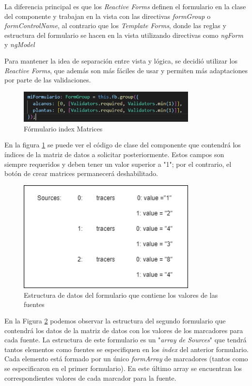 La diferencia principal es que los \emph{Reactive Forms} definen el formulario en la clase del componente y trabajan  en la vista con las directivas \emph{formGroup} o \emph{formControlName},  al contrario que los \emph{Template Forms}, donde las reglas y estructura del  formulario se hacen en la vista utilizando directivas como \emph{ngForm} y \emph{ngModel}

Para mantener la idea de separación entre vista y lógica, se decidió utilizar los \emph{Reactive Forms}, que además son más fáciles de usar y permiten más adaptaciones por parte de las validaciones.

\begin{figure}[h!] 
\centering
    \includegraphics[width=0.8\textwidth]{img/formIndexMatrix.PNG}
\caption{Fórmulario index Matrices}
\label{fig:formIndexMatrix}
\end{figure}

En la figura \ref{fig:formIndexMatrix} se puede ver el código de clase del componente que contendrá los índices de la matriz de datos a solicitar posteriormente. Estos campos son siempre requeridos y deben tener un valor superior a "1"; por el contrario, el botón de crear matrices permanecerá deshabilitado.

\begin{figure}[h!] 
\centering
    \includegraphics[width=0.8\textwidth]{img/formSources.png}
\caption{Estructura de datos del formulario que contiene los valores de las fuentes}
\label{fig:formSources}
\end{figure}

En la Figura \ref{fig:formSources} podemos observar la estructura del segundo formulario que contendrá los datos de la matriz de datos con los valores de los marcadores para cada fuente. La estructura de este formulario es un "\textit{array de Sources}"  que tendrá tantos elementos como fuentes se especifiquen en los \textit{index} del anterior formulario. Cada elemento está formado por un único \textit{formArray} de marcadores (tantos como se especificaron en el primer formulario). En este último array se encuentran los correspondientes valores de cada marcador para la fuente.

